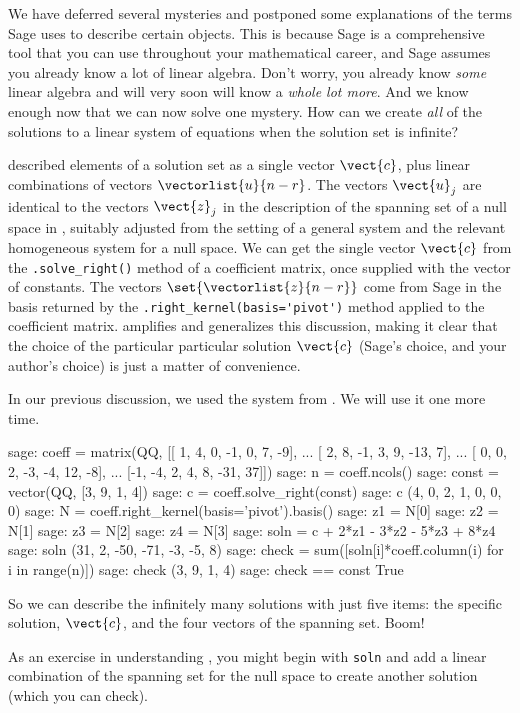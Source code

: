 We have deferred several mysteries and postponed some explanations of the terms Sage uses to describe certain objects.  This is because Sage is a comprehensive tool that you can use throughout your mathematical career, and Sage assumes you already know a lot of linear algebra.  Don't worry, you already know \emph{some} linear algebra and will very soon will know a \emph{whole lot more}.  And we know enough now that we can now solve one mystery.  How can we create \emph{all} of the solutions to a linear system of equations when the solution set is infinite?\par
%
 described elements of a solution set as a single vector $\vect{c}$, plus linear combinations of vectors $\vectorlist{u}{n-r}$.  The vectors $\vect{u}_j$ are identical to the vectors $\vect{z}_j$ in the description of the spanning set of a null space in , suitably adjusted from the setting of a general system and the relevant homogeneous system for a null space.  We can get the single vector $\vect{c}$ from the \verb?.solve_right()? method of a coefficient matrix, once supplied with the vector of constants.  The vectors $\set{\vectorlist{z}{n-r}}$ come from Sage in the basis returned by the \verb?.right_kernel(basis='pivot')? method applied to the coefficient matrix.   amplifies and generalizes this discussion, making it clear that the choice of the particular particular solution $\vect{c}$ (Sage's choice, and your author's choice) is just a matter of convenience.\par
%
In our previous discussion, we used the system from .  We will use it one more time.
%
\begin{sageexample}
sage: coeff = matrix(QQ, [[ 1,  4,  0, -1,  0,   7, -9],
...                       [ 2,  8, -1,  3,  9, -13,  7],
...                       [ 0,  0,  2, -3, -4,  12, -8],
...                       [-1, -4,  2,  4,  8, -31, 37]])
sage: n = coeff.ncols()
sage: const = vector(QQ, [3, 9, 1, 4])
sage: c = coeff.solve_right(const)
sage: c
(4, 0, 2, 1, 0, 0, 0)
sage: N = coeff.right_kernel(basis='pivot').basis()
sage: z1 = N[0]
sage: z2 = N[1]
sage: z3 = N[2]
sage: z4 = N[3]
sage: soln = c + 2*z1 - 3*z2 - 5*z3 + 8*z4
sage: soln
(31, 2, -50, -71, -3, -5, 8)
sage: check = sum([soln[i]*coeff.column(i) for i in range(n)])
sage: check
(3, 9, 1, 4)
sage: check == const
True
\end{sageexample}
%
So we can describe the infinitely many solutions with just five items: the specific solution, $\vect{c}$, and the four vectors of the spanning set.  Boom!\par
%
As an exercise in understanding , you might begin with \verb?soln? and add a linear combination of the spanning set for the null space to create another solution (which you can check).
%
\begin{sageverbatim}
\end{sageverbatim}
%